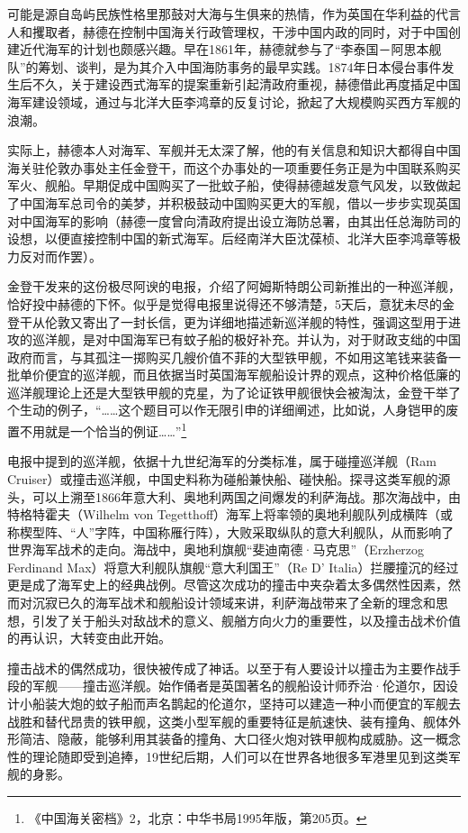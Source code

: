 \documentclass[12pt,UTF8]{ctexbook}
\begin{document}
可能是源自岛屿民族性格里那鼓对大海与生俱来的热情，作为英国在华利益的代言人和攫取者，赫德在控制中国海关行政管理权，干涉中国内政的同时，对于中国创建近代海军的计划也颇感兴趣。早在1861年，赫德就参与了“李泰国－阿思本舰队”的筹划、谈判，是为其介入中国海防事务的最早实践。1874年日本侵台事件发生后不久，关于建设西式海军的提案重新引起清政府重视，赫德借此再度插足中国海军建设领域，通过与北洋大臣李鸿章的反复讨论，掀起了大规模购买西方军舰的浪潮。

实际上，赫德本人对海军、军舰并无太深了解，他的有关信息和知识大都得自中国海关驻伦敦办事处主任金登干，而这个办事处的一项重要任务正是为中国联系购买军火、舰船。早期促成中国购买了一批蚊子船，使得赫德越发意气风发，以致做起了中国海军总司令的美梦，并积极鼓动中国购买更大的军舰，借以一步步实现英国对中国海军的影响（赫德一度曾向清政府提出设立海防总署，由其出任总海防司的设想，以便直接控制中国的新式海军。后经南洋大臣沈葆桢、北洋大臣李鸿章等极力反对而作罢）。

金登干发来的这份极尽阿谀的电报，介绍了阿姆斯特朗公司新推出的一种巡洋舰，恰好投中赫德的下怀。似乎是觉得电报里说得还不够清楚，5天后，意犹未尽的金登干从伦敦又寄出了一封长信，更为详细地描述新巡洋舰的特性，强调这型用于进攻的巡洋舰，是对中国海军已有蚊子船的极好补充。并认为，对于财政支绌的中国政府而言，与其孤注一掷购买几艘价值不菲的大型铁甲舰，不如用这笔钱来装备一批单价便宜的巡洋舰，而且依据当时英国海军舰船设计界的观点，这种价格低廉的巡洋舰理论上还是大型铁甲舰的克星，为了论证铁甲舰很快会被淘汰，金登干举了个生动的例子，“……这个题目可以作无限引申的详细阐述，比如说，人身铠甲的废置不用就是一个恰当的例证……”\footnote{《中国海关密档》2，北京：中华书局1995年版，第205页。}

电报中提到的巡洋舰，依据十九世纪海军的分类标准，属于碰撞巡洋舰（Ram Cruiser）或撞击巡洋舰，中国史料称为碰船兼快船、碰快船。探寻这类军舰的源头，可以上溯至1866年意大利、奥地利两国之间爆发的利萨海战。那次海战中，由特格特霍夫（Wilhelm von Tegetthoff）海军上将率领的奥地利舰队列成横阵（或称楔型阵、“人”字阵，中国称雁行阵），大败采取纵队的意大利舰队，从而影响了世界海军战术的走向。海战中，奥地利旗舰“斐迪南德·马克思”（Erzherzog Ferdinand Max）将意大利舰队旗舰“意大利国王”（Re D' Italia）拦腰撞沉的经过更是成了海军史上的经典战例。尽管这次成功的撞击中夹杂着太多偶然性因素，然而对沉寂已久的海军战术和舰船设计领域来讲，利萨海战带来了全新的理念和思想，引发了关于船头对敌战术的意义、舰艏方向火力的重要性，以及撞击战术价值的再认识，大转变由此开始。

撞击战术的偶然成功，很快被传成了神话。以至于有人要设计以撞击为主要作战手段的军舰——撞击巡洋舰。始作俑者是英国著名的舰船设计师乔治·伦道尔，因设计小船装大炮的蚊子船而声名鹊起的伦道尔，坚持可以建造一种小而便宜的军舰去战胜和替代昂贵的铁甲舰，这类小型军舰的重要特征是航速快、装有撞角、舰体外形简洁、隐蔽，能够利用其装备的撞角、大口径火炮对铁甲舰构成威胁。这一概念性的理论随即受到追捧，19世纪后期，人们可以在世界各地很多军港里见到这类军舰的身影。
\end{document}
